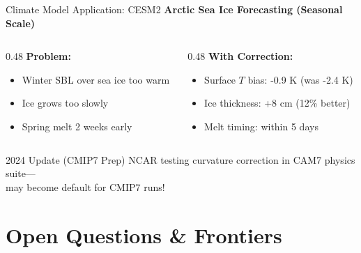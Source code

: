 \documentclass[10pt,aspectratio=169]{beamer}
\begin{document}
\begin{frame}{Climate Model Application: CESM2}
  \textbf{Arctic Sea Ice Forecasting (Seasonal Scale)}
  
  \vspace{0.3cm}
  \begin{columns}[T]
    \begin{column}{0.48\textwidth}
      \textbf{Problem:}
      \begin{itemize}
        \item Winter SBL over sea ice too warm
        \item Ice grows too slowly
        \item Spring melt 2 weeks early
      \end{itemize}
    \end{column}
    \begin{column}{0.48\textwidth}
      \textbf{With Correction:}
      \begin{itemize}
        \item Surface $T$ bias: -0.9 K (was -2.4 K)
        \item Ice thickness: +8 cm (12\% better)
        \item Melt timing: within 5 days
      \end{itemize}
    \end{column}
  \end{columns}
  
  \vspace{0.5cm}
  \begin{exampleblock}{2024 Update (CMIP7 Prep)}
    NCAR testing curvature correction in CAM7 physics suite—\\
    may become \alert{default} for CMIP7 runs!
  \end{exampleblock}
\end{frame}

\section{Open Questions \& Frontiers}
\end{document}
